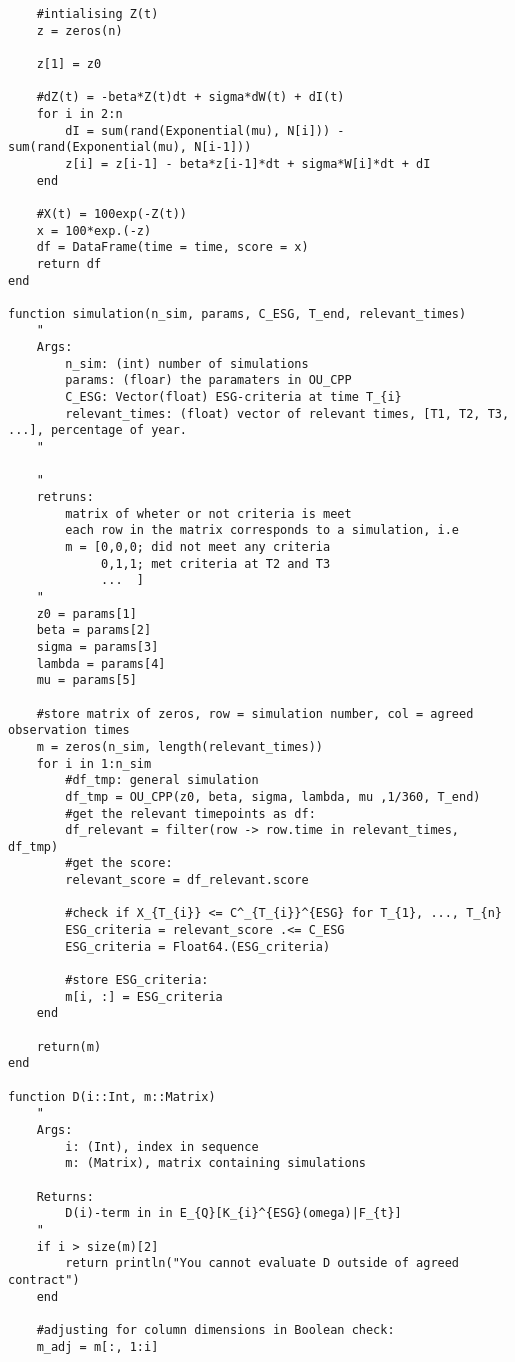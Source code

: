 \begin{verbatim}
    #intialising Z(t)
    z = zeros(n)

    z[1] = z0

    #dZ(t) = -beta*Z(t)dt + sigma*dW(t) + dI(t)
    for i in 2:n 
        dI = sum(rand(Exponential(mu), N[i])) - sum(rand(Exponential(mu), N[i-1]))
        z[i] = z[i-1] - beta*z[i-1]*dt + sigma*W[i]*dt + dI
    end

    #X(t) = 100exp(-Z(t))
    x = 100*exp.(-z)
    df = DataFrame(time = time, score = x)
    return df
end

function simulation(n_sim, params, C_ESG, T_end, relevant_times)
    "
    Args:
        n_sim: (int) number of simulations 
        params: (floar) the paramaters in OU_CPP
        C_ESG: Vector(float) ESG-criteria at time T_{i}            
        relevant_times: (float) vector of relevant times, [T1, T2, T3, ...], percentage of year.
    "

    "
    retruns:
        matrix of wheter or not criteria is meet
        each row in the matrix corresponds to a simulation, i.e
        m = [0,0,0; did not meet any criteria
             0,1,1; met criteria at T2 and T3
             ...  ] 
    "
    z0 = params[1]
    beta = params[2]
    sigma = params[3]
    lambda = params[4]
    mu = params[5]

    #store matrix of zeros, row = simulation number, col = agreed observation times
    m = zeros(n_sim, length(relevant_times))
    for i in 1:n_sim
        #df_tmp: general simulation 
        df_tmp = OU_CPP(z0, beta, sigma, lambda, mu ,1/360, T_end)
        #get the relevant timepoints as df:
        df_relevant = filter(row -> row.time in relevant_times, df_tmp)
        #get the score:
        relevant_score = df_relevant.score
    
        #check if X_{T_{i}} <= C^_{T_{i}}^{ESG} for T_{1}, ..., T_{n}
        ESG_criteria = relevant_score .<= C_ESG 
        ESG_criteria = Float64.(ESG_criteria)
        
        #store ESG_criteria:
        m[i, :] = ESG_criteria
    end

    return(m)
end

function D(i::Int, m::Matrix)
    " 
    Args:
        i: (Int), index in sequence 
        m: (Matrix), matrix containing simulations

    Returns: 
        D(i)-term in in E_{Q}[K_{i}^{ESG}(omega)|F_{t}]    
    "
    if i > size(m)[2]
        return println("You cannot evaluate D outside of agreed contract")
    end
    
    #adjusting for column dimensions in Boolean check:
    m_adj = m[:, 1:i]


\end{verbatim}

